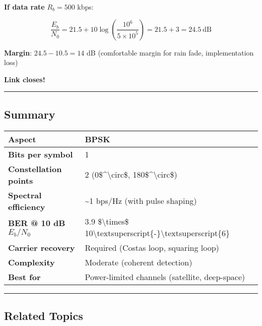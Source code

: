 \textbf{If data rate} \(R_b = 500\) kbps:

\[
\frac{E_b}{N_0} = 21.5 + 10\log\left(\frac{10^6}{5 \times 10^5}\right) = 21.5 + 3 = 24.5\ \text{dB}
\]

\textbf{Margin}: \(24.5 - 10.5 = 14\) dB (comfortable margin for rain
fade, implementation loss)

\textbf{Link closes!}

\begin{center}\rule{0.5\linewidth}{0.5pt}\end{center}

\subsection{Summary}\label{summary}

{\def\LTcaptype{} %
\begin{longtable}[]{@{}ll@{}}
\toprule\noalign{}
Aspect & BPSK \\
\midrule\noalign{}
\endhead
\bottomrule\noalign{}
\endlastfoot
\textbf{Bits per symbol} & 1 \\
\textbf{Constellation points} & 2 (0\$\^{}\textbackslash circ\$,
180\$\^{}\textbackslash circ\$) \\
\textbf{Spectral efficiency} & \textasciitilde1 bps/Hz (with pulse
shaping) \\
\textbf{BER @ 10 dB \(E_b/N_0\)} & 3.9 \$\textbackslash times\$
10\textbackslash textsuperscript\{-\}\textbackslash textsuperscript\{6\} \\
\textbf{Carrier recovery} & Required (Costas loop, squaring loop) \\
\textbf{Complexity} & Moderate (coherent detection) \\
\textbf{Best for} & Power-limited channels (satellite, deep-space) \\
\end{longtable}
}

\begin{center}\rule{0.5\linewidth}{0.5pt}\end{center}

\subsection{Related Topics}\label{related-topics}

